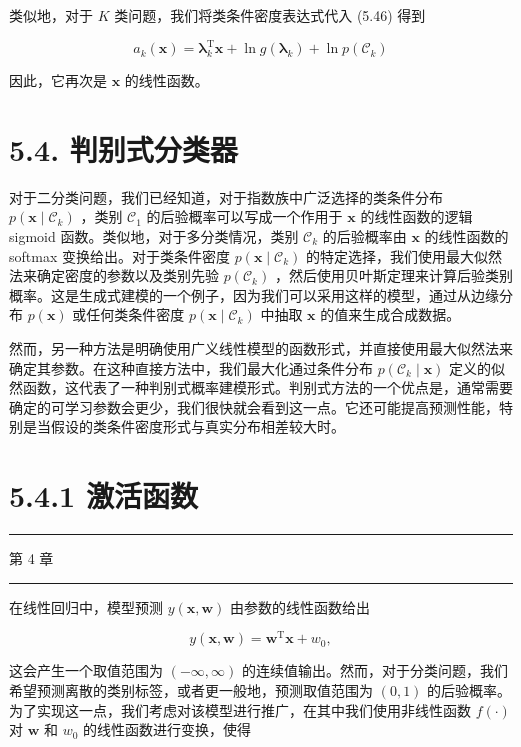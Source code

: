 \documentclass[10pt]{report}
\newcommand{\HRule}{\begin{center}\rule{0.9\linewidth}{0.2mm}\end{center}}
\begin{document}
类似地，对于 \(K\) 类问题，我们将类条件密度表达式代入 (5.46) 得到

\[
{a}_{k}\left( \mathbf{x}\right)  = {\mathbf{\lambda }}_{k}^{\mathrm{T}}\mathbf{x} + \ln g\left( {\mathbf{\lambda }}_{k}\right)  + \ln p\left( {\mathcal{C}}_{k}\right)  \tag{5.68}
\]

因此，它再次是 \(\mathbf{x}\) 的线性函数。

\section*{5.4. 判别式分类器}

对于二分类问题，我们已经知道，对于指数族中广泛选择的类条件分布 \(p\left( {\mathbf{x} \mid  {\mathcal{C}}_{k}}\right)\) ，类别 \({\mathcal{C}}_{1}\) 的后验概率可以写成一个作用于 \(\mathbf{x}\) 的线性函数的逻辑 sigmoid 函数。类似地，对于多分类情况，类别 \({\mathcal{C}}_{k}\) 的后验概率由 \(\mathbf{x}\) 的线性函数的 softmax 变换给出。对于类条件密度 \(p\left( {\mathbf{x} \mid  {\mathcal{C}}_{k}}\right)\) 的特定选择，我们使用最大似然法来确定密度的参数以及类别先验 \(p\left( {\mathcal{C}}_{k}\right)\) ，然后使用贝叶斯定理来计算后验类别概率。这是生成式建模的一个例子，因为我们可以采用这样的模型，通过从边缘分布 \(p\left( \mathbf{x}\right)\) 或任何类条件密度 \(p\left( {\mathbf{x} \mid  {\mathcal{C}}_{k}}\right)\) 中抽取 \(\mathbf{x}\) 的值来生成合成数据。

然而，另一种方法是明确使用广义线性模型的函数形式，并直接使用最大似然法来确定其参数。在这种直接方法中，我们最大化通过条件分布 \(p\left( {{\mathcal{C}}_{k} \mid  \mathbf{x}}\right)\) 定义的似然函数，这代表了一种判别式概率建模形式。判别式方法的一个优点是，通常需要确定的可学习参数会更少，我们很快就会看到这一点。它还可能提高预测性能，特别是当假设的类条件密度形式与真实分布相差较大时。

\section*{5.4.1 激活函数}

\HRule

第 4 章

\HRule

在线性回归中，模型预测 \(y\left( {\mathbf{x},\mathbf{w}}\right)\) 由参数的线性函数给出

\[
y\left( {\mathbf{x},\mathbf{w}}\right)  = {\mathbf{w}}^{\mathrm{T}}\mathbf{x} + {w}_{0}, \tag{5.69}
\]

这会产生一个取值范围为 \(\left( {-\infty ,\infty }\right)\) 的连续值输出。然而，对于分类问题，我们希望预测离散的类别标签，或者更一般地，预测取值范围为 \(\left( {0,1}\right)\) 的后验概率。为了实现这一点，我们考虑对该模型进行推广，在其中我们使用非线性函数 \(f\left( \cdot \right)\) 对 \(\mathbf{w}\) 和 \({w}_{0}\) 的线性函数进行变换，使得
\end{document}
